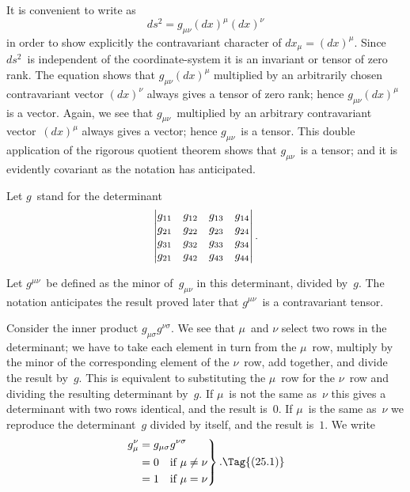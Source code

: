 \documentclass[12pt]{book}
\begin{document}
%

It is convenient to write  as
\[
ds^{2} = g_{\mu\nu} (dx)^{\mu} (dx)^{\nu}
\]
in order to show explicitly the contravariant character of $dx_{\mu} = (dx)^{\mu}$. Since
$ds^{2}$~is independent of the coordinate\hyp{}system it is an invariant or tensor
of zero rank. The equation shows that $g_{\mu\nu} (dx)^{\mu}$ multiplied by an arbitrarily
chosen contravariant vector $(dx)^{\nu}$ always gives a tensor of zero rank; hence
$g_{\mu\nu} (dx)^{\mu}$ is a vector. Again, we see that $g_{\mu\nu}$~multiplied by an arbitrary contravariant
vector~$(dx)^{\mu}$ always gives a vector; hence $g_{\mu\nu}$~is a tensor. This
double application of the rigorous quotient theorem shows that $g_{\mu\nu}$~is a
tensor; and it is evidently covariant as the notation has anticipated.

Let $g$~stand for the determinant
\[
\left\lvert
\begin{array}{@{}cccc@{}}
  g_{11} & g_{12} & g_{13} & g_{14} \\
  g_{21} & g_{22} & g_{23} & g_{24} \\
  g_{31} & g_{32} & g_{33} & g_{34} \\
  g_{21} & g_{42} & g_{43} & g_{44} \\
\end{array}\right\rvert.
\]

Let $g^{\mu\nu}$~be defined as the minor of~$g_{\mu\nu}$ in this determinant, divided by~$g$\footnotemark.\footnotetext
  {The notation anticipates the result proved later that $g^{\mu\nu}$~is a contravariant tensor.}

Consider the inner product $g_{\mu\sigma} g^{\nu\sigma}$. We see that $\mu$~and $\nu$ select two rows
in the determinant; we have to take each element in turn from the $\mu$~row,
multiply by the minor of the corresponding element of the $\nu$~row, add
together, and divide the result by~$g$. This is equivalent to substituting the
$\mu$~row for the $\nu$~row and dividing the resulting determinant by~$g$. If $\mu$~is not
the same as~$\nu$ this gives a determinant with two rows identical, and the
result is~$0$. If $\mu$~is the same as~$\nu$ we reproduce the determinant~$g$ divided by
itself, and the result is~$1$. We write
\[
\left.
\begin{aligned}
  g_{\mu}^{\nu} &= g_{\mu\sigma} g^{\nu\sigma} \\
  &= 0 \quad\text{if $\mu \neq \nu$} \\
  &= 1 \quad\text{if $\mu = \nu$}
\end{aligned}
\right\}.
\Tag{(25.1)}
\]
\end{document}
